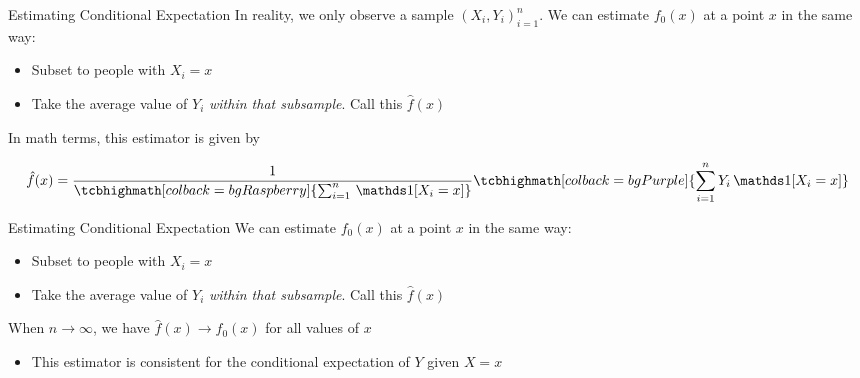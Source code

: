 \documentclass[aspectratio=169,t,11pt,table]{beamer}
\begin{document}
\begin{frame}{Estimating Conditional Expectation}
  In reality, we only observe a sample $(X_i, Y_i)_{i=1}^n$. We can estimate $f_0(x)$ at a point $x$ in the same way:
  \begin{itemize}
    \item Subset to people with $X_i = x$
    \item Take the average value of $Y_i$ \emph{within that subsample}. Call this $\hat{f}(x)$
  \end{itemize}

  \bigskip
  In math terms, this estimator is given by
  
  \vspace*{-\medskipamount}
  $$
    \hat{f}(x) = 
    \frac{1}{\tcbhighmath[colback = bgRaspberry]{\sum_{i=1}^n \one{X_i = x}}} 
    \tcbhighmath[colback = bgPurple]{\sum_{i=1}^n Y_i \one{X_i = x}}
  $$

\end{frame}

\begin{frame}{Estimating Conditional Expectation}
  We can estimate $f_0(x)$ at a point $x$ in the same way:
  \begin{itemize}
    \item Subset to people with $X_i = x$
    \item Take the average value of $Y_i$ \emph{within that subsample}. Call this $\hat{f}(x)$
  \end{itemize}
  
  \bigskip
  When $n \to \infty$, we have $\hat{f}(x) \to f_0(x)$ for all values of $x$
  \begin{itemize}
    \item This estimator is consistent for the conditional expectation of $Y$ given $X = x$
  \end{itemize}
\end{frame}
\end{document}
